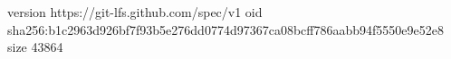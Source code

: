 version https://git-lfs.github.com/spec/v1
oid sha256:b1c2963d926bf7f93b5e276dd0774d97367ca08bcff786aabb94f5550e9e52e8
size 43864
